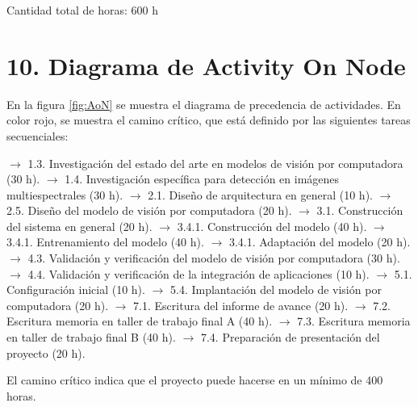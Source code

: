 \documentclass[
11pt, %
]{charter}
\begin{document}
Cantidad total de horas: 600 h

\section{10. Diagrama de Activity On Node}
\label{sec:AoN}

En la figura \ref{fig:AoN} se muestra el diagrama de precedencia de actividades. En color rojo, se muestra el camino crítico, que está definido por las siguientes tareas secuenciales:

$\rightarrow$ 1.3. Investigación del estado del arte en modelos de visión por computadora (30 h). \newline
$\rightarrow$ 1.4. Investigación específica para detección en imágenes multiespectrales (30 h). \newline
$\rightarrow$ 2.1. Diseño de arquitectura en general (10 h). \newline
$\rightarrow$ 2.5. Diseño del modelo de visión por computadora (20 h). \newline
$\rightarrow$ 3.1. Construcción del sistema en general (20 h). \newline
$\rightarrow$ 3.4.1. Construcción del modelo (40 h). \newline
$\rightarrow$ 3.4.1. Entrenamiento del modelo (40 h). \newline
$\rightarrow$ 3.4.1. Adaptación del modelo (20 h). \newline
$\rightarrow$ 4.3. Validación y verificación del modelo de visión por computadora (30 h). \newline
$\rightarrow$ 4.4. Validación y verificación de la integración de aplicaciones (10 h). \newline
$\rightarrow$ 5.1. Configuración inicial (10 h). \newline
$\rightarrow$ 5.4. Implantación del modelo de visión por computadora (20 h). \newline
$\rightarrow$ 7.1. Escritura del informe de avance (20 h). \newline
$\rightarrow$ 7.2. Escritura memoria en taller de trabajo final A (40 h). \newline
$\rightarrow$ 7.3. Escritura memoria en taller de trabajo final B (40 h). \newline
$\rightarrow$ 7.4. Preparación de presentación del proyecto (20 h).


El camino crítico indica que el proyecto puede hacerse en un mínimo de 400 horas.
\end{document}
